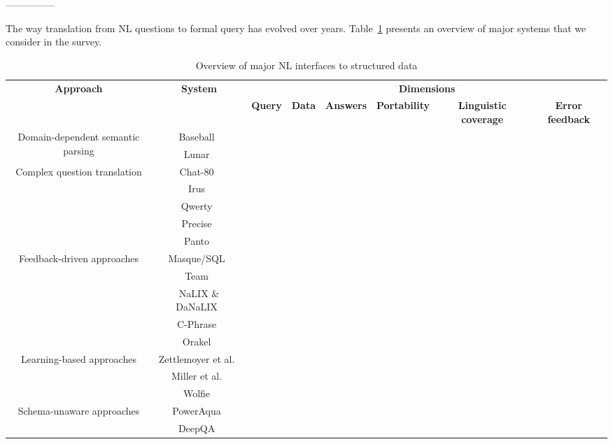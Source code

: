 \documentclass[10pt,journal,letterpaper,compsoc]{IEEEtran}
\begin{document}
---------------

The way translation from NL questions to formal query has evolved over years.
Table~\ref{tab:overview} presents an overview of major systems that we consider
in the survey.

\begin{table}
\centering
\begin{tabular}{|c|c|c|c|c|c|c|c|}\hline
\multirow{2}{*}{\bf Approach} & \multirow{2}{*}{\bf System} &
\multicolumn{6}{c|}{\bf Dimensions}\\\cline{3-8}
& & {\bf Query} & {\bf Data} & {\bf Answers} & {\bf Portability} & {\bf
Linguistic coverage} & {\bf Error feedback}\\\hline\hline 
\multirow{2}{*}{Domain-dependent semantic parsing} & {\sc
Baseball}~\cite{Green:1961:BAQ:1460690.1460714} & & & & & & \\\cline{2-8}
& {\sc Lunar}~\cite{Woods:1973:PNL:1499586.1499695} & & & & & & \\\hline
\multirow{5}{*}{Complex question translation} & {\sc
Chat-80}~\cite{Warren:1982:EEA:972942.972944} & & & & & & \\\cline{2-8}
& {\sc Irus}~\cite{Bates:1983:IRU:511793.511804} & & & & & & \\\cline{2-8}
& {\sc Qwerty}~\cite{Nelken:2000:QTD:992730.992808} & & & & & & \\\cline{2-8}
& {\sc
Precise}~\cite{Popescu:2004:MNL:1220355.1220376,Popescu:2003:TTN:604045.604070}
& & & & & & \\\cline{2-8}
& {\sc Panto}~\cite{Wang:2007:PPN:1419662.1419706} & & & & & & \\\hline
\multirow{5}{*}{Feedback-driven approaches} &
{\sc Masque/SQL}~\cite{Androutsopoulos93masque} & & & & & & \\\cline{2-8}
& {\sc Team}~\cite{Grosz:1987:TED:25672.25674} & & & & & & \\\cline{2-8}
& {\sc NaLIX} \& {\sc DaNaLIX}~\cite{Li:2005:NIN:1066157.1066281} & & & & & &
\\\cline{2-8}
& {\sc C-Phrase}~\cite{Minock:2010:CSB:1715942.1716190} & & & & & &
\\\cline{2-8}
& {\sc
Orakel}~\cite{Cimiano:2007:PNL:1216295.1216330} & & & & & & \\\hline
\multirow{3}{*}{Learning-based approaches} & Zettlemoyer
et al.~\cite{DBLP:conf/uai/ZettlemoyerC05} & & & & & & \\\cline{2-8}
& Miller et al.~\cite{Miller:1996:FSA:981863.981871} & & & & & & \\\cline{2-8}
& {\sc Wolfie}~\cite{Thompson:2003:AWM:1622420.1622421} & & & & & &
\\\hline
\multirow{2}{*}{Schema-unaware approaches} & {\sc
PowerAqua}~\cite{DBLP:conf/esws/LopezMU06} & & & & & & \\\cline{2-8}
 & {\sc DeepQA}~\cite{DBLP:journals/aim/FerrucciBCFGKLMNPSW10} & & & & & &
 \\\hline
\end{tabular}
\caption{Overview of major NL interfaces to structured data}
\label{tab:overview}
\end{table}
\end{document}
